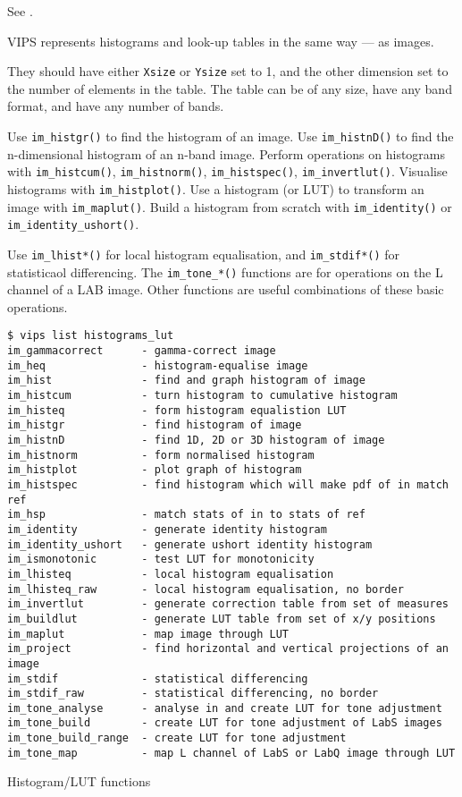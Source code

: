 See .

VIPS represents histograms and look-up tables in the same way --- as images.

They should have either \verb+Xsize+ or \verb+Ysize+ set to 1, and the
other dimension set to the number of elements in the table. The table can be
of any size, have any band format, and have any number of bands.

Use \verb+im_histgr()+ to find the histogram of an image.  Use
\verb+im_histnD()+ to find the n-dimensional histogram of an n-band
image.  Perform operations on histograms with \verb+im_histcum()+,
\verb+im_histnorm()+, \verb+im_histspec()+, \verb+im_invertlut()+. Visualise
histograms with \verb+im_histplot()+. Use a histogram (or LUT) to transform
an image with \verb+im_maplut()+. Build a histogram from scratch with
\verb+im_identity()+ or \verb+im_identity_ushort()+.

Use \verb+im_lhist*()+ for local histogram equalisation, and
\verb+im_stdif*()+ for statisticaol differencing. The \verb+im_tone_*()+
functions are for operations on the L channel of a LAB image. Other
functions are useful combinations of these basic operations.

\begin{fig2}
\begin{verbatim}
$ vips list histograms_lut
im_gammacorrect      - gamma-correct image
im_heq               - histogram-equalise image
im_hist              - find and graph histogram of image
im_histcum           - turn histogram to cumulative histogram
im_histeq            - form histogram equalistion LUT
im_histgr            - find histogram of image
im_histnD            - find 1D, 2D or 3D histogram of image
im_histnorm          - form normalised histogram
im_histplot          - plot graph of histogram
im_histspec          - find histogram which will make pdf of in match ref
im_hsp               - match stats of in to stats of ref
im_identity          - generate identity histogram
im_identity_ushort   - generate ushort identity histogram
im_ismonotonic       - test LUT for monotonicity
im_lhisteq           - local histogram equalisation
im_lhisteq_raw       - local histogram equalisation, no border
im_invertlut         - generate correction table from set of measures
im_buildlut          - generate LUT table from set of x/y positions
im_maplut            - map image through LUT
im_project           - find horizontal and vertical projections of an image
im_stdif             - statistical differencing
im_stdif_raw         - statistical differencing, no border
im_tone_analyse      - analyse in and create LUT for tone adjustment
im_tone_build        - create LUT for tone adjustment of LabS images
im_tone_build_range  - create LUT for tone adjustment
im_tone_map          - map L channel of LabS or LabQ image through LUT
\end{verbatim}
\caption{Histogram/LUT functions}
\label{fg:hist}
\end{fig2}
  
